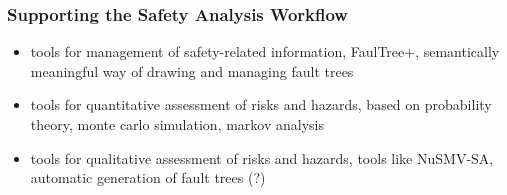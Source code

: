 \documentclass[a4paper, 10pt]{article}
\begin{document}
\subsubsection*{Supporting the Safety Analysis Workflow}
\begin{itemize}
    \item tools for management of safety-related information, FaulTree+, semantically meaningful way of drawing and managing fault trees
    \item tools for quantitative assessment of risks and hazards, based on probability theory, monte carlo simulation, markov analysis
    \item tools for qualitative assessment of risks and hazards, tools like NuSMV-SA, automatic generation of fault trees (?)
\end{itemize}
\end{document}

